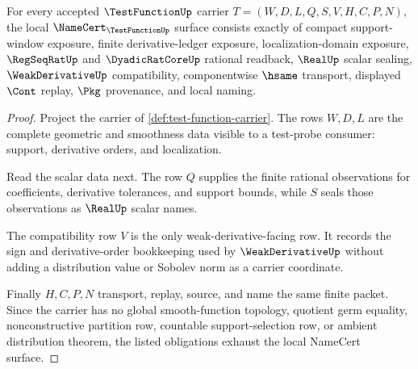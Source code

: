\begin{theorem}
\label{thm:test-function-namecert-obligations}
For every accepted $\TestFunctionUp$ carrier $T=(W,D,L,Q,S,V,H,C,P,N)$, the local $\NameCert_{\TestFunctionUp}$ surface consists exactly of compact support-window exposure, finite derivative-ledger exposure, localization-domain exposure, $\RegSeqRatUp$ and $\DyadicRatCoreUp$ rational readback, $\RealUp$ scalar sealing, $\WeakDerivativeUp$ compatibility, componentwise $\hsame$ transport, displayed $\Cont$ replay, $\Pkg$ provenance, and local naming.
\end{theorem}
\begin{proof}
Project the carrier of \autoref{def:test-function-carrier}. The rows $W,D,L$ are the complete geometric and smoothness data visible to a test-probe consumer: support, derivative orders, and localization.

Read the scalar data next. The row $Q$ supplies the finite rational observations for coefficients, derivative tolerances, and support bounds, while $S$ seals those observations as $\RealUp$ scalar names.

The compatibility row $V$ is the only weak-derivative-facing row. It records the sign and derivative-order bookkeeping used by $\WeakDerivativeUp$ without adding a distribution value or Sobolev norm as a carrier coordinate.

Finally $H,C,P,N$ transport, replay, source, and name the same finite packet. Since the carrier has no global smooth-function topology, quotient germ equality, nonconstructive partition row, countable support-selection row, or ambient distribution theorem, the listed obligations exhaust the local NameCert surface.
\end{proof}

